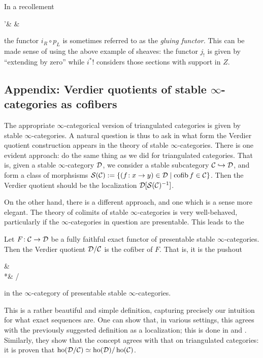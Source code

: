 In a recollement
\begin{diagram*}[column sep=large]
	\calT'\ar[r,"i" description,""{below,name=A},""{above,name=AA}] &
		\calT \ar[r,"p" description,""{below,name=C},""{above,name=CC}]\ar[l,bend left,shift left,"i_R",""{above,name=B}]\ar[l,bend right,shift right,"i_L"',""{below,name=BB}] &
		 \ar[l,bend left,shift left,"p_R",""{above,name=D}]\ar[l,bend right,shift right,"p_L"',""{below,name=DD}]
		\ar[from=B,to=A,symbol=\vdash]\ar[from=D,to=C,symbol=\vdash]
		\ar[from=AA,to=BB,symbol=\vdash]\ar[from=CC,to=DD,symbol=\vdash]
\end{diagram*}
the functor \(i_R\circ p_L\) is sometimes referred to as the \emph{gluing functor.} This can be made sense of using the above example of sheaves: the functor \(j_!\) is given
by ``extending by zero'' while \(i^*!\) considers those sections with support in \(Z\).

\subsection{Appendix: Verdier quotients of stable \(\infty\)-categories as cofibers}
The appropriate \(\infty\)-categorical version of triangulated categories is given by stable \(\infty\)-categories. A natural question is thus to ask in
what form the Verdier quotient construction appears in the theory of stable \(\infty\)-categories. There is one evident approach: do the same thing as we did
for triangulated categories. That is, given a stable \(\infty\)-category \(\mathcal{D}\), we consider a stable subcategory \(\mathcal{C}\hookrightarrow\mathcal{D}\), and form
a class of morphsisms \(\mathcal{S}(\mathcal{C}) := \{ (f\!:x\to y)\in\mathcal{D}\mid \operatorname{cofib}{f}\in\mathcal{C} \}\). Then the Verdier quotient should be the localization \(\mathcal{D}[\mathcal{S}(\mathcal{C})^{-1}]\).

On the other hand, there is a different approach, and one which is a sense more elegant. The theory of colimits of stable \(\infty\)-categories is very well-behaved,
particularly if the \(\infty\)-categories in question are presentable. This leads to the
\begin{definition}
	Let \(F\!:\mathcal{C}\to\mathcal{D}\) be a fully faithful exact functor of presentable stable \(\infty\)-categories. Then the Verdier quotient \(\mathcal{D}/\mathcal{C}\)
	is the cofiber of \(F\). That is, it is the pushout
	\begin{diagram*}
		\calC\ar[r,"F"]\ar[d] & \calD\ar[d] \\
		*\ar[r] & \calD/\calC\ar[ul,pushout]
	\end{diagram*}
	in the \(\infty\)-category of presentable stable \(\infty\)-categories.
\end{definition}
This is a rather beautiful and simple definition, capturing precisely our intuition for what exact sequences are. One can show that, in various settings,
this agrees with the previously suggested definition as a localization; this is done in \cite{Blumberg_Gepner_Tabuada_2013} and \cite{drew2015verdierquotientsstablequasicategories}.
Similarly, they show that the concept agrees with that on triangulated categories: it is proven that \(\operatorname{ho}(\mathcal{D}/\mathcal{C})\simeq\operatorname{ho}(\mathcal{D})/\operatorname{ho}(\mathcal{C})\).

